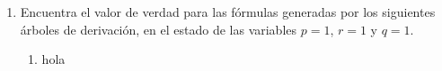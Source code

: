 \documentclass[11pt,letterpaper]{article}
\begin{document}
\begin{enumerate}
    \item Encuentra el valor de verdad para las fórmulas generadas por los
    siguientes árboles de derivación, en el estado de las variables $p = 1$,
    $r = 1$ y $q = 1$.
        \begin{enumerate}
            \item hola \\
        \end{enumerate}
\end{enumerate}
\end{document}
